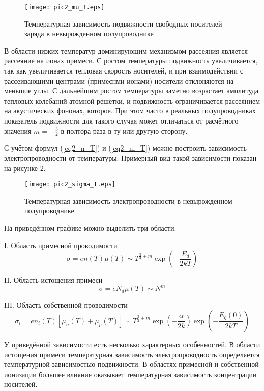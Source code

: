 \begin{figure}[h!]\centering
\texttt{[image: pic2\_mu\_T.eps]}
\caption{Температурная зависимость подвижности свободных носителей заряда в невырожденном полупроводнике}
\label{pic2_mu_T}
\end{figure}

В области низких температур доминирующим механизмом рассеяния является рассеяние на ионах примеси. С ростом температуры подвижность увеличивается, так как увеличивается тепловая скорость носителей, и при взаимодействии с рассеивающими центрами (примеснми ионами) носители отклоняются на меньшие углы. С дальнейшим ростом температуры заметно возрастает амплитуда тепловых колебаний атомной решётки, и подвижность ограничивается рассеянием на акустических фононах, которое. При этом часто в реальных полупроводниках показатель подвижности для такого случая может отличаться от расчётного значения $m = -\frac{3}{2}$ в полтора раза в ту или другую сторону.

С учётом формул (\ref{eq2_n_T}) и (\ref{eq2_ni_T}) можно построить зависимость электропроводности от температуры. Примерный вид такой зависимости показан на рисунке \ref{pic2_sigma_T}.

\begin{figure}[h!]\centering
\texttt{[image: pic2\_sigma\_T.eps]}
\caption{Температурная зависимость электропроводности в невырожденном полупроводнике}
\label{pic2_sigma_T}
\end{figure}

На приведённом графике можно выделить три области.

I. Область примесной проводимости
\begin{equation}
\sigma = e n(T) \mu(T) \sim T^{\frac{3}{4} + m} \exp{\left( -\frac{E_{d}}{2 k T} \right)}
\end{equation}

II. Область истощения примеси
\begin{equation}
\sigma = e N_{d} \mu(T) \sim N^{m}
\end{equation}

III. Область собственной проводимости
\begin{equation}
\sigma_{i} = e n_{i}(T) \left[ \mu_{n}(T) + \mu_{p}(T) \right] \sim T^{\frac{3}{2} + m} \exp{\left( -\frac{\alpha}{2 k} \right)} \exp{\left( -\frac{E_{g}(0)}{2 k T} \right)}
\end{equation}

У приведённой зависимости есть несколько характерных особенностей. В области истощения примеси температурная зависимость электропроводность определяется температурной зависимостью подвижности. В областях примесной и собственной ионизации большее влияние оказывает температурная зависимость концентрации носителей.

